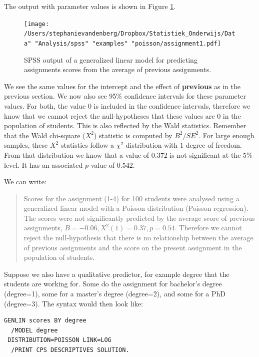 \documentclass[]{report}\usepackage[]{graphicx}\usepackage[]{color}
\begin{document}
The output with parameter values is shown in Figure \ref{fig:assignment1}.


\begin{figure}[h]
    \begin{center}
       \texttt{[image: /Users/stephanievandenberg/Dropbox/Statistiek\_Onderwijs/Data" "Analysis/spss" "examples" "poisson/assignment1.pdf]}
    \end{center}
     \caption{SPSS output of a generalized linear model for predicting assignments scores from the average of previous assignments.}
    \label{fig:assignment1}
\end{figure}


We see the same values for the intercept and the effect of \textbf{previous} as in the previous section. We now also see 95\% confidence intervals for these parameter values. For both, the value 0 is included in the confidence intervals, therefore we know that we cannot reject the null-hypotheses that these values are 0 in the population of students. This is also reflected by the Wald statistics. Remember that the Wald chi-square ($X^2$) statistic is computed by $B^2/SE^2$. For large enough samples, these $X^2$ statistics follow a $\chi^2$ distribution with 1 degree of freedom. From that distribution we know that a value of 0.372 is not significant at the 5\% level. It has an associated $p$-value of 0.542.

We can write:

\begin{quotation}
Scores for the assignment (1-4) for 100 students were analysed using a generalized linear model with a Poisson distribution (Poisson regression). The scores were not significantly predicted by the average score of previous assignments, $B=-0.06, X^2(1)=0.37, p=0.54$. Therefore we cannot reject the null-hypothesis that there is no relationship between the average of previous assignments and the score on the present assignment in the population of students.
\end{quotation}



Suppose we also have a qualitative predictor, for example degree that the students are working for. Some do the assignment for bachelor's degree (degree=1), some for a master's degree (degree=2), and some for a PhD (degree=3). The syntax would then look like:


\begin{verbatim}
GENLIN scores BY degree
  /MODEL degree
 DISTRIBUTION=POISSON LINK=LOG
  /PRINT CPS DESCRIPTIVES SOLUTION.
\end{verbatim}
\end{document}
